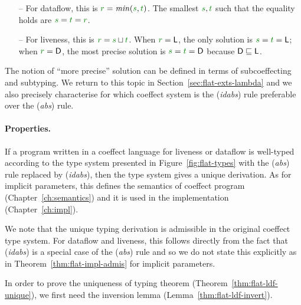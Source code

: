 \begin{itemize}
  \item[--] For dataflow, this is $\cclrd{r}=\mathit{min}(\cclrd{s}, \cclrd{t})$. The smallest
    $\cclrd{s}, \cclrd{t}$ such that the equality holds are $\cclrd{s}=\cclrd{t}=\cclrd{r}$.
 \item[--] For liveness, this is $\cclrd{r}=\cclrd{s} \sqcup \cclrd{t}$. When $\cclrd{r}=\ident{L}$,
   the only solution is $\cclrd{s}=\cclrd{t}=\ident{L}$; when $\cclrd{r}=\ident{D}$, the most
   precise solution is $\cclrd{s}=\cclrd{t}=\ident{D}$ because $\textnormal{\sffamily D}\sqsubseteq\textnormal{\sffamily L}$.
\end{itemize}

The notion of ``more precise'' solution can be defined in terms of subcoeffecting and subtyping.
We return to this topic in Section~\ref{sec:flat-exts-lambda} and we also precisely characterise
for which coeffect system is the (\emph{idabs}) rule preferable over the (\emph{abs}) rule.

\paragraph{Properties.}
If a program written in a coeffect language for liveness or dataflow is well-typed according to
the type system presented in Figure~\ref{fig:flat-types} with the (\emph{abs}) rule replaced by
(\emph{idabs}), then the type system gives a unique derivation. As for implicit parameters, this
defines the semantics of coeffect program (Chapter~\ref{ch:semantics}) and it is used in the
implementation (Chapter~\ref{ch:impl}).

We note that the unique typing derivation is admissible in the original coeffect type system.
For dataflow and liveness, this follows directly from the fact that (\emph{idabs}) is a special
case of the (\emph{abs}) rule and so we do not state this explicitly as in
Theorem~\ref{thm:flat-impl-admis} for implicit parameters.

In order to prove the uniqueness of typing theorem (Theorem~\ref{thm:flat-ldf-unique}), we first
need the inversion lemma (Lemma~\ref{thm:flat-ldf-invert}).

